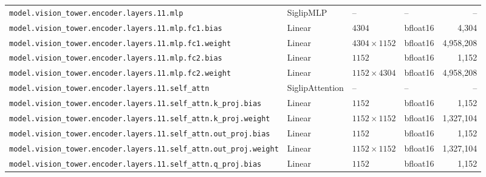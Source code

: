 \documentclass[10pt,a4paper]{article}
\theoremstyle{definition}
\begin{document}
\begin{appendices}
{\begin{longtable}{p{6.8cm}>{\raggedright\arraybackslash}p{3.3cm}llr}
\texttt{model.\allowbreak{}vision\_tower.\allowbreak{}encoder.\allowbreak{}layers.\allowbreak{}11.\allowbreak{}mlp} & Siglip\allowbreak{}MLP & -- & -- & -- \\
\texttt{model.\allowbreak{}vision\_tower.\allowbreak{}encoder.\allowbreak{}layers.\allowbreak{}11.\allowbreak{}mlp.\allowbreak{}fc1.\allowbreak{}bias} & Linear & $4304$ & bfloat16 & 4,304 \\
\texttt{model.\allowbreak{}vision\_tower.\allowbreak{}encoder.\allowbreak{}layers.\allowbreak{}11.\allowbreak{}mlp.\allowbreak{}fc1.\allowbreak{}weight} & Linear & $4304 \times 1152$ & bfloat16 & 4,958,208 \\
\texttt{model.\allowbreak{}vision\_tower.\allowbreak{}encoder.\allowbreak{}layers.\allowbreak{}11.\allowbreak{}mlp.\allowbreak{}fc2.\allowbreak{}bias} & Linear & $1152$ & bfloat16 & 1,152 \\
\texttt{model.\allowbreak{}vision\_tower.\allowbreak{}encoder.\allowbreak{}layers.\allowbreak{}11.\allowbreak{}mlp.\allowbreak{}fc2.\allowbreak{}weight} & Linear & $1152 \times 4304$ & bfloat16 & 4,958,208 \\
\texttt{model.\allowbreak{}vision\_tower.\allowbreak{}encoder.\allowbreak{}layers.\allowbreak{}11.\allowbreak{}self\_attn} & Siglip\allowbreak{}Attention & -- & -- & -- \\
\texttt{model.\allowbreak{}vision\_tower.\allowbreak{}encoder.\allowbreak{}layers.\allowbreak{}11.\allowbreak{}self\_attn.\allowbreak{}k\_proj.\allowbreak{}bias} & Linear & $1152$ & bfloat16 & 1,152 \\
\texttt{model.\allowbreak{}vision\_tower.\allowbreak{}encoder.\allowbreak{}layers.\allowbreak{}11.\allowbreak{}self\_attn.\allowbreak{}k\_proj.\allowbreak{}weight} & Linear & $1152 \times 1152$ & bfloat16 & 1,327,104 \\
\texttt{model.\allowbreak{}vision\_tower.\allowbreak{}encoder.\allowbreak{}layers.\allowbreak{}11.\allowbreak{}self\_attn.\allowbreak{}out\_proj.\allowbreak{}bias} & Linear & $1152$ & bfloat16 & 1,152 \\
\texttt{model.\allowbreak{}vision\_tower.\allowbreak{}encoder.\allowbreak{}layers.\allowbreak{}11.\allowbreak{}self\_attn.\allowbreak{}out\_proj.\allowbreak{}weight} & Linear & $1152 \times 1152$ & bfloat16 & 1,327,104 \\
\texttt{model.\allowbreak{}vision\_tower.\allowbreak{}encoder.\allowbreak{}layers.\allowbreak{}11.\allowbreak{}self\_attn.\allowbreak{}q\_proj.\allowbreak{}bias} & Linear & $1152$ & bfloat16 & 1,152 \\

\end{longtable}}
\end{appendices}
\end{document}
